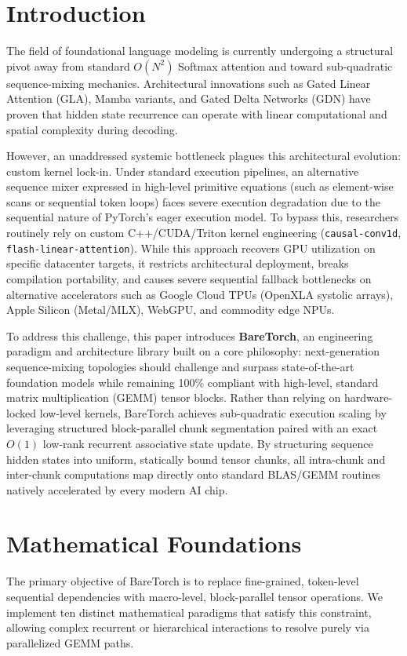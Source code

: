 \documentclass[twocolumn,10pt]{article}
\begin{document}
\section{Introduction}
The field of foundational language modeling is currently undergoing a structural pivot away from standard $O(N^2)$ Softmax attention and toward sub-quadratic sequence-mixing mechanics. Architectural innovations such as Gated Linear Attention (GLA), Mamba variants, and Gated Delta Networks (GDN) have proven that hidden state recurrence can operate with linear computational and spatial complexity during decoding.

However, an unaddressed systemic bottleneck plagues this architectural evolution: custom kernel lock-in. Under standard execution pipelines, an alternative sequence mixer expressed in high-level primitive equations (such as element-wise scans or sequential token loops) faces severe execution degradation due to the sequential nature of PyTorch's eager execution model. To bypass this, researchers routinely rely on custom C++/CUDA/Triton kernel engineering (\texttt{causal-conv1d}, \texttt{flash-linear-attention}). While this approach recovers GPU utilization on specific datacenter targets, it restricts architectural deployment, breaks compilation portability, and causes severe sequential fallback bottlenecks on alternative accelerators such as Google Cloud TPUs (OpenXLA systolic arrays), Apple Silicon (Metal/MLX), WebGPU, and commodity edge NPUs.

To address this challenge, this paper introduces \textbf{BareTorch}, an engineering paradigm and architecture library built on a core philosophy: next-generation sequence-mixing topologies should challenge and surpass state-of-the-art foundation models while remaining 100\% compliant with high-level, standard matrix multiplication (GEMM) tensor blocks. Rather than relying on hardware-locked low-level kernels, BareTorch achieves sub-quadratic execution scaling by leveraging structured block-parallel chunk segmentation paired with an exact $O(1)$ low-rank recurrent associative state update. By structuring sequence hidden states into uniform, statically bound tensor chunks, all intra-chunk and inter-chunk computations map directly onto standard BLAS/GEMM routines natively accelerated by every modern AI chip.

\section{Mathematical Foundations}
The primary objective of BareTorch is to replace fine-grained, token-level sequential dependencies with macro-level, block-parallel tensor operations. We implement ten distinct mathematical paradigms that satisfy this constraint, allowing complex recurrent or hierarchical interactions to resolve purely via parallelized GEMM paths.
\end{document}
